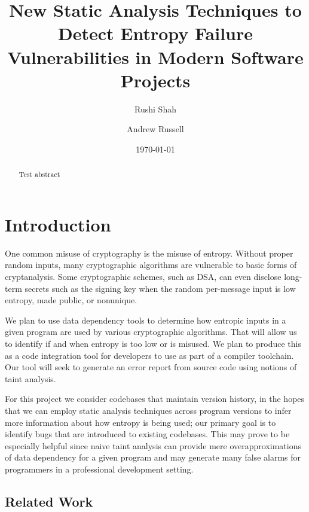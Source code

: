 \documentclass[letterpaper,twocolumn,10pt]{article}
\begin{document}
\date{\today}

\title{\Large \bf New Static Analysis Techniques to Detect Entropy Failure Vulnerabilities in Modern Software Projects}

\author{
{\rm Rushi Shah}
\and
{\rm Andrew Russell}
}

\maketitle

\begin{abstract}
 Test abstract
\end{abstract}

\section{Introduction}

One common misuse of cryptography is the misuse of entropy. Without proper random inputs, many cryptographic algorithms
are vulnerable to basic forms of cryptanalysis. Some cryptographic schemes, such as DSA, can even disclose long-term secrets
such as the signing key when the random per-message input is low entropy, made public, or nonunique.

We plan to use data dependency tools to determine how entropic inputs in a given program are used by various cryptographic algorithms. That will allow us to identify if and when entropy is too low or is misused. We plan to produce this as a code integration tool for developers to use as part of a compiler toolchain.
Our tool will seek to generate an error report from source code using notions of taint analysis. 

For this project we consider codebases that maintain version history, in the hopes that we can employ static analysis techniques across program versions to infer more information about how entropy is being used; 
our primary goal is to identify bugs that are introduced to existing codebases. This may prove to be especially helpful since naive taint analysis can provide mere overapproximations of data dependency for a given program and may generate many false alarms for programmers in a professional development setting.

\subsection{Related Work}
\end{document}
